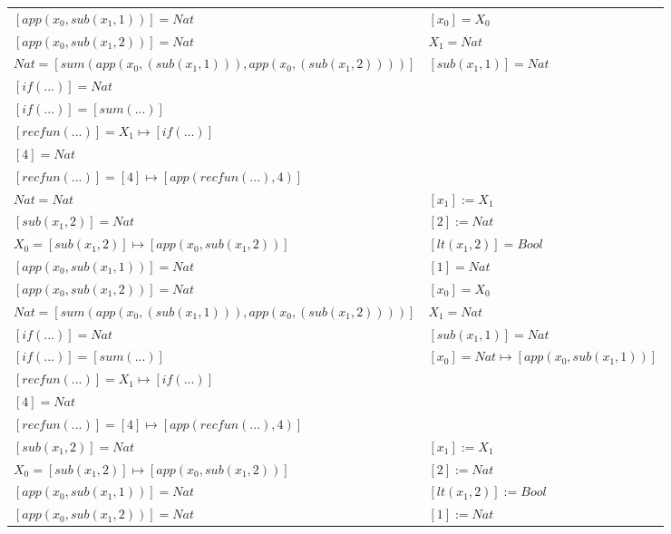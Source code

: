 \begin{exercise}
\begin{description}
\begin{center}
\begin{longtable}{ | l | l | }
                        $[app(x_0, sub(x_1,1))] = Nat$ & $[x_0] = X_0$ \\
                        $[app(x_0, sub(x_1,2))] = Nat$ & $X_1 = Nat$ \\
                        $Nat = [sum(app(x_0, (sub(x_1,1))), app(x_0, (sub(x_1,2))))]$ &  $[sub(x_1,1)] = Nat$\\
                        $[if(...)] = Nat$ & \\
                        $[if(...)] = [sum(...)]$ & \\
                        $[recfun(...)] = X_1 \mapsto [if(...)]$ & \\
                        $[4] = Nat$ & \\
                        $[recfun(...)] = [4] \mapsto [app(recfun(...), 4)]$ & \\
                    \hline
                        $Nat = Nat$ & $[x_1] := X_1$ \\
                        $[sub(x_1,2)] = Nat$ & $[2] := Nat$ \\
                        $X_0 = [sub(x_1,2)] \mapsto [app(x_0, sub(x_1,2))]$ & $[lt(x_1 , 2)] = Bool$ \\
                        $[app(x_0, sub(x_1,1))] = Nat$ & $[1] = Nat$ \\
                        $[app(x_0, sub(x_1,2))] = Nat$ & $[x_0] = X_0$ \\
                        $Nat = [sum(app(x_0, (sub(x_1,1))), app(x_0, (sub(x_1,2))))]$ & $X_1 = Nat$ \\
                        $[if(...)] = Nat$ & $[sub(x_1,1)] = Nat$ \\
                        $[if(...)] = [sum(...)]$ & $[x_0] = Nat \mapsto [app(x_0, sub(x_1,1))]$ \\
                        $[recfun(...)] = X_1 \mapsto [if(...)]$ & \\
                        $[4] = Nat$ & \\
                        $[recfun(...)] = [4] \mapsto [app(recfun(...), 4)]$ & \\
                    \hline
                        $[sub(x_1,2)] = Nat$ & $[x_1] := X_1$ \\
                        $X_0 =  [sub(x_1,2)] \mapsto [app(x_0, sub(x_1,2))]$ & $[2] := Nat$ \\
                        $[app(x_0, sub(x_1,1))] = Nat$ & $[lt(x_1 , 2)] := Bool$ \\
                        $[app(x_0, sub(x_1,2))] = Nat$ & $[1] := Nat$ \\

\end{longtable}
\end{center}
\end{description}
\end{exercise}
